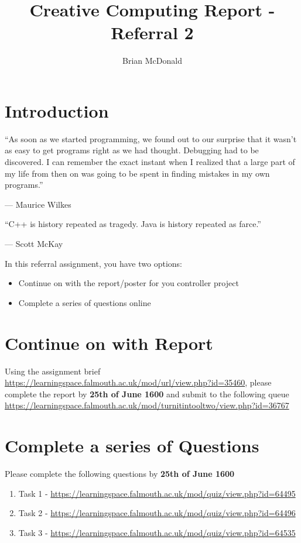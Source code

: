 \documentclass{../../../fal_assignment}
\title{Creative Computing Report - Referral 2}
\author{Brian McDonald}
\begin{document}
	
	\maketitle
	
	\section*{Introduction}
	
	\begin{marginquote}
		``As soon as we started programming, we found out to our surprise that it wasn't as easy to get programs right as we had thought. Debugging had to be discovered. I can remember the exact instant when I realized that a large part of my life from then on was going to be spent in finding mistakes in my own programs.''
		\par --- Maurice Wilkes
		\marginquoterule
		\par ``C++ is history repeated as tragedy. Java is history repeated as farce.''
		\par --- Scott McKay
	\end{marginquote}
	
	In this referral assignment, you have two options:
	
	\begin{itemize}
		\item Continue on with the report/poster for you controller project
		\item Complete a series of questions online 
	\end{itemize}

	\section*{Continue on with Report}
	
	Using the assignment brief \url{https://learningspace.falmouth.ac.uk/mod/url/view.php?id=35460}, please complete the report by \textbf{25th of June 1600} and submit to the following queue \url{https://learningspace.falmouth.ac.uk/mod/turnitintooltwo/view.php?id=36767}
	
	\section*{Complete a series of Questions}
	
	Please complete the following questions by \textbf{25th of June 1600}
	
	\begin{enumerate}
		\item Task 1 - \url{https://learningspace.falmouth.ac.uk/mod/quiz/view.php?id=64495}
		\item Task 2 - \url{https://learningspace.falmouth.ac.uk/mod/quiz/view.php?id=64496}
		\item Task 3 - \url{https://learningspace.falmouth.ac.uk/mod/quiz/view.php?id=64535}
	\end{enumerate}
	
\end{document}
